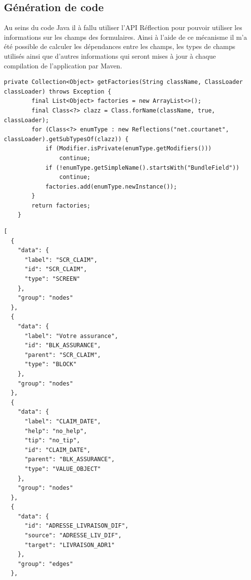 \subsection{Génération de code}
Au seins du code Java il à fallu utiliser l'API Réflection pour pouvoir utiliser les informations sur les champs des formulaires. Ainsi à l'aide de ce mécanisme il m'a été possible de calculer les dépendances entre les champs, les types de champs utilisés ainsi que d'autres informations qui seront mises à jour à chaque compilation de l'application par Maven.

\begin{lstlisting}[caption=Introspection du JAR]
    private Collection<Object> getFactories(String className, ClassLoader classLoader) throws Exception {
        final List<Object> factories = new ArrayList<>();
        final Class<?> clazz = Class.forName(className, true, classLoader);
        for (Class<?> enumType : new Reflections("net.courtanet", classLoader).getSubTypesOf(clazz)) {
            if (Modifier.isPrivate(enumType.getModifiers()))
                continue;
            if (!enumType.getSimpleName().startsWith("BundleField"))
                continue;
            factories.add(enumType.newInstance());
        }
        return factories;
    }
\end{lstlisting}
\begin{multicols}{2}
\begin{lstlisting}[caption=Exemple de fichier JSON généré]
[
  {
    "data": {
      "label": "SCR_CLAIM",
      "id": "SCR_CLAIM",
      "type": "SCREEN"
    },
    "group": "nodes"
  },
  {
    "data": {
      "label": "Votre assurance",
      "id": "BLK_ASSURANCE",
      "parent": "SCR_CLAIM",
      "type": "BLOCK"
    },
    "group": "nodes"
  },
  {
    "data": {
      "label": "CLAIM_DATE",
      "help": "no_help",
      "tip": "no_tip",
      "id": "CLAIM_DATE",
      "parent": "BLK_ASSURANCE",
      "type": "VALUE_OBJECT"
    },
    "group": "nodes"
  },
  {
    "data": {
      "id": "ADRESSE_LIVRAISON_DIF",
      "source": "ADRESSE_LIV_DIF",
      "target": "LIVRAISON_ADR1"
    },
    "group": "edges"
  },
\end{lstlisting}

\end{multicols}
